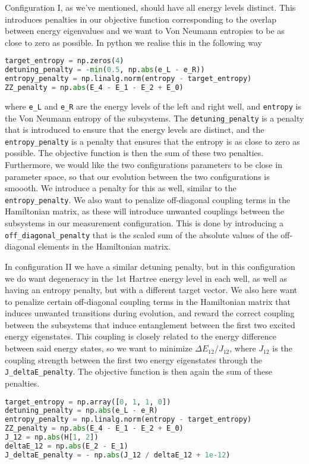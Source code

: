 \documentclass{subfiles}
\begin{document}
Configuration I, as we've mentioned, should have all energy levels distinct. This introduces penalties in our objective function corresponding to the overlap between energy eigenvalues and we want to Von Neumann entropies to be as close to zero as possible. In python we realise this in the following way
\begin{lstlisting}[language=Python]
target_entropy = np.zeros(4)
detuning_penalty = -min(0.5, np.abs(e_L - e_R))
entropy_penalty = np.linalg.norm(entropy - target_entropy)
ZZ_penalty = np.abs(E_4 - E_1 - E_2 + E_0)
\end{lstlisting}
where \texttt{e\_L} and \texttt{e\_R} are the energy levels of the left and right well, and \texttt{entropy} is the Von Neumann entropy of the subsystems. The \texttt{detuning\_penalty} is a penalty that is introduced to ensure that the energy levels are distinct, and the \texttt{entropy\_penalty} is a penalty that ensures that the entropy is as close to zero as possible. The objective function is then the sum of these two penalties. Furthermore, we would like the two configurations parameters to be close in parameter space, so that our evolution between the two configurations is smoooth. We introduce a penalty for this as well, similar to the \texttt{entropy\_penalty}. We also want to penalize off-diagonal coupling terms in the Hamiltonian matrix, as these will introduce unwanted couplings between the subsystems in our measurement configuration. This is done by introducing a \texttt{off\_diagonal\_penalty} that is the scaled sum of the absolute values of the off-diagonal elements in the Hamiltonian matrix.

In configuration II we have a similar detuning penalty, but in this configuration we do want degeneracy in the 1st Hartree energy level in each well, as well as having an entropy penalty, but with a different target vector. We also here want to penalize certain off-diagonal coupling terms in the Hamiltonian matrix that induces unwanted transitions during evolution, and reward the correct coupling between the subsystems that induce entanglement between the first two excited energy eigenstates. This coupling is closely related to the energy difference between said energy states, so we want to minimize $\Delta E_{12} / J_{12}$, where $J_{12}$ is the coupling strength between the first two energy eigenstates through the \texttt{J\_deltaE\_penalty}. 
The objective function is then again the sum of these penalties.
\begin{lstlisting}[language=Python]
target_entropy = np.array([0, 1, 1, 0])
detuning_penalty = np.abs(e_L - e_R)
entropy_penalty = np.linalg.norm(entropy - target_entropy)
ZZ_penalty = np.abs(E_4 - E_1 - E_2 + E_0)
J_12 = np.abs(H[1, 2])  
deltaE_12 = np.abs(E_2 - E_1)  
J_deltaE_penalty = - np.abs(J_12 / deltaE_12 + 1e-12)  
\end{lstlisting}
\end{document}
